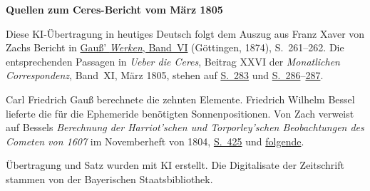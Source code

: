 \clearpage\thispagestyle{empty}
\begin{center}\textbf{Quellen zum Ceres-Bericht vom März 1805}\end{center}
\noindent Diese KI-Übertragung in heutiges Deutsch folgt dem Auszug aus Franz Xaver von Zachs Bericht in \href{https://gdz.sub.uni-goettingen.de/id/PPN236007467}{Gauß’ \textit{Werken}, Band~VI} (Göttingen, 1874), S.~261--262. Die entsprechenden Passagen in \textit{Ueber die Ceres}, Beitrag XXVI der \textit{Monatlichen Correspondenz}, Band~XI, März 1805, stehen auf \href{https://www.digitale-sammlungen.de/en/view/bsb10538603?page=295}{S.~283} und \href{https://www.digitale-sammlungen.de/en/view/bsb10538603?page=298}{S.~286}--\href{https://www.digitale-sammlungen.de/en/view/bsb10538603?page=299}{287}.
\par\smallskip\noindent Carl Friedrich Gauß berechnete die zehnten Elemente. Friedrich Wilhelm Bessel lieferte die für die Ephemeride benötigten Sonnenpositionen. Von Zach verweist auf Bessels \textit{Berechnung der Harriot’schen und Torporley’schen Beobachtungen des Cometen von 1607} im Novemberheft von 1804, \href{https://www.digitale-sammlungen.de/en/view/bsb10538602?page=439}{S.~425} und \href{https://www.digitale-sammlungen.de/en/view/bsb10538602?page=440}{folgende}.
\par\smallskip\noindent Übertragung und Satz wurden mit KI erstellt. Die Digitalisate der Zeitschrift stammen von der Bayerischen Staatsbibliothek.
\clearpage
